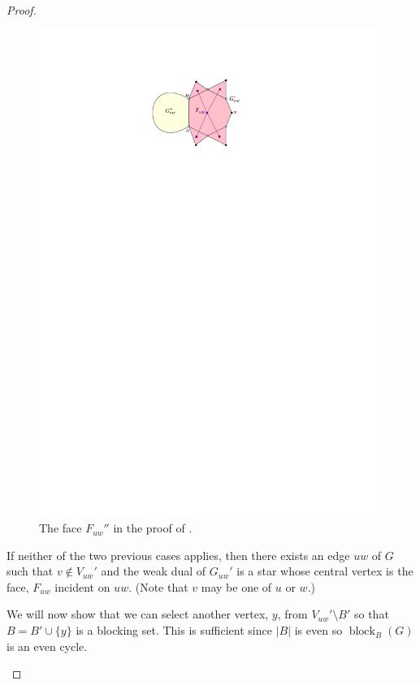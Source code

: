\documentclass{patmorin}
\DeclareMathOperator{\block}{block}
\begin{document}
\begin{proof}
\begin{enumerate}
  \begin{figure}
    \begin{center}
       \includegraphics{figs/toughie}
    \end{center}
    \caption{The face $F_{uw}''$ in the proof of .}
  \end{figure}

  If neither of the two previous  cases applies, then there exists an edge
  $uw$ of $G$ such that $v\not\in V_{uw}'$ and the weak dual of $G_{uw}'$
  is a star whose central vertex is the face, $F_{uw}$ incident on $uw$.
  (Note that $v$ may be one of $u$ or $w$.)

  We will now show that we can select another vertex, $y$, from
  $V_{uw}'\setminus B'$ so that $B=B'\cup\{y\}$ is a blocking set.
  This is sufficient since $|B|$ is even so $\block_B(G)$ is an even
  cycle.  


\end{enumerate}
\end{proof}
\end{document}
